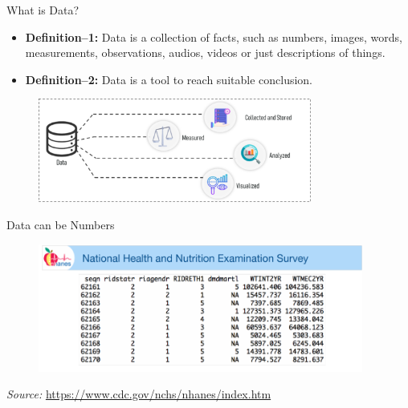 \begin{frame}[t]{What is Data?}
	\begin{itemize}
		\item \textbf{Definition--1:} Data is a collection of facts, such as 
		numbers, 
		images, words, 
		measurements, observations, audios, videos or just descriptions of 
		things.
		\item \textbf{Definition--2:} Data is a tool to reach suitable 
		conclusion. 
	\end{itemize}
	 
\begin{figure} [ht]
	\centering
	\includegraphics[width=0.8\textwidth]{stats_img/data.png}
\end{figure}
\end{frame}


\begin{frame}[t]{Data can be Numbers}
	\begin{figure} [ht]
		\centering
		\includegraphics[width=0.95\textwidth]{img/nchs}
	\end{figure}
	\centering 
	\textit{Source:} \url{https://www.cdc.gov/nchs/nhanes/index.htm}
\end{frame}

